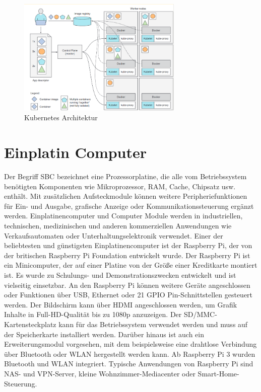 \begin{figure}[bth] 
	\centering
	\includegraphics[width=0.7\textwidth]{Graphics/Kubernetes_Architektur.png}
	\caption{Kubernetes Architektur}
\end{figure}

\section{Einplatin Computer}

Der Begriff \ac{SBC} bezeichnet eine Prozessorplatine, die alle
vom Betriebssystem benötigten Komponenten wie Mikroprozessor, \ac{RAM}, Cache, Chipsatz usw. enthält. Mit zusätzlichen Aufsteckmodule können weitere Peripheriefunktionen für Ein- und Ausgabe, grafische Anzeige oder Kommunikationssteuerung ergänzt werden. Einplatinencomputer und Computer Module werden in industriellen, technischen, medizinischen und anderen kommerziellen Anwendungen wie Verkaufsautomaten oder Unterhaltungselektronik verwendet\cite{itwissen2017:raspi}.
Einer der beliebtesten und günstigsten Einplatinencomputer ist der Raspberry Pi, der von der britischen Raspberry Pi Foundation entwickelt wurde.
Der Raspberry Pi ist ein Minicomputer, der auf einer Platine von der Größe einer Kreditkarte montiert ist. Es wurde zu Schulungs- und Demonstrationszwecken entwickelt und ist vielseitig einsetzbar. An den Raspberry Pi können weitere Geräte angeschlossen oder Funktionen über USB, Ethernet oder 21 GPIO Pin-Schnittstellen gesteuert werden. Der Bildschirm kann über HDMI angeschlossen werden, um Grafik Inhalte in Full-HD-Qualität bis zu 1080p anzuzeigen. Der SD/MMC-Kartensteckplatz kann für das Betriebssystem verwendet werden und muss auf der Speicherkarte installiert werden. Darüber hinaus ist auch ein Erweiterungsmodul vorgesehen, mit dem beispielsweise eine drahtlose Verbindung über Bluetooth oder WLAN hergestellt werden kann. Ab Raspberry Pi 3 wurden Bluetooth und WLAN integriert. Typische Anwendungen von Raspberry Pi sind NAS- und VPN-Server, kleine Wohnzimmer-Mediacenter oder Smart-Home-Steuerung\cite{Cording2021:raspi}.

